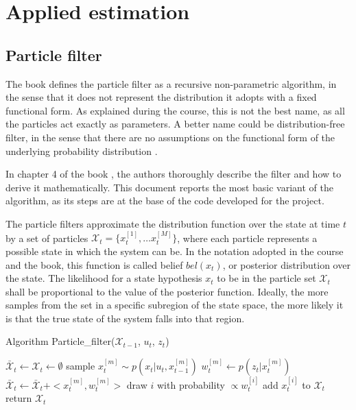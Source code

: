\documentclass[letterpaper,twocolumn,10pt]{article}
\begin{document}
\section{Applied estimation}
\label{sec:3}

\subsection*{Particle filter}
The book defines the particle filter as a recursive non-parametric algorithm, in the sense that it does not represent the distribution it adopts with a fixed functional form. As explained during the course, this is not the best name, as all the particles act exactly as parameters. A better name could be distribution-free filter, in the sense that there are no assumptions on the functional form of the underlying probability distribution \cite{AppliedEstimation}.

In chapter 4 of the book \cite{thrun2005probabilistic}, the authors thoroughly describe the filter and how to derive it mathematically. This document reports the most basic variant of the algorithm, as its steps are at the base of the code developed for the project. 

The particle filters approximate the distribution function over the state at time $t$ by a set of particles $\mathcal{X}_t=\{x_t^{[1]},\dots x_t^{[M]}\}$, where each particle represents a possible state in which the system can be. In the notation adopted in the course and the book, this function is called belief $bel(x_t)$, or posterior distribution over the state. The likelihood for a state hypothesis $x_t$ to be in the particle set $\mathcal{X}_t$ shall be proportional to the value of the posterior function. Ideally, the more samples from the set in a specific subregion of the state space, the more likely it is that the true state of the system falls into that region.


\begin{algorithm}
\caption{Algorithm Particle\_filter($\mathcal{X}_{t-1}$, $u_t$, $z_t$)}\label{alg:1}
\begin{algorithmic}[1]
\State $\bar{\mathcal{X}}_t \gets \mathcal{X}_t \gets \emptyset$
    \State sample $x_t^{[m]} \sim p(x_t|u_t,x_{t-1}^{[m]})$
    \State $w_t^{[m]} \gets p(z_t|x_t^{[m]})$
    \State $\bar{\mathcal{X}}_t \gets \bar{\mathcal{X}}_t+<x_t^{[m]},w_t^{[m]}>$
\EndWhile
{} 
    \State draw $i$ with probability $\propto w_t^{[i]}$
    \State add $x_t^{[i]}$ to $\mathcal{X}_t$
\EndWhile
\State return $\mathcal{X}_t$
\end{algorithmic}
\end{algorithm}
\end{document}
